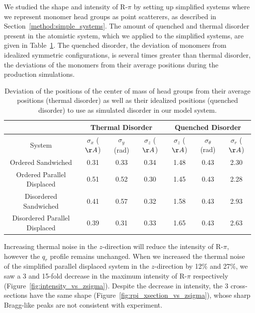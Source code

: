 \documentclass[journal=jpcbfk,manuscript=article]{achemso}
\begin{document}
  We studied the shape and intensity of R-$\pi$ by setting up simplified
  systems where we represent monomer head groups as point scatterers, as
  described in Section~\ref{method:simple_systems}. The amount of quenched and
  thermal disorder present in the atomistic system, which we applied to the
  simplified systems, are given in Table~\ref{table:quenched_disorder}. The
  quenched disorder, the deviation of monomers from idealized symmetric
  configurations, is several times greater than thermal disorder, the 
  deviations of the monomers from their average positions during the 
  production simulations.
  
  \begin{table}[h]
  \centering
  \begin{tabular}{c|ccc|ccc}
  \toprule
   		                        &           \multicolumn{3}{c}{Thermal Disorder}             &             \multicolumn{3}{c}{Quenched Disorder}               \\
  \midrule
  System                        & $\sigma_x$ ($\AA$) & $\sigma_y$ (rad) & $\sigma_z$ ($\AA$) & $\sigma_z$ ($\AA$) & $\sigma_\theta$ (rad) & $\sigma_r$ ($\AA$) \\
  \midrule
  Ordered Sandwiched            &         0.31       &       0.33       &        0.34        &        1.48        &     0.43              &     2.30           \\
  Ordered Parallel Displaced    &         0.51       &       0.52       &        0.30        &        1.45        &     0.43              &     2.28           \\ 
  Disordered Sandwiched         &         0.41       &       0.57       &        0.32        &        1.58        &     0.43              &     2.93           \\
  Disordered Parallel Displaced &         0.39       &       0.31       &        0.33        &        1.65        &     0.43              &     2.63           \\
  \bottomrule
  \end{tabular}
  \caption{Deviation of the positions of the center of mass of head groups from their average
  positions (thermal disorder) as well as their idealized positions (quenched disorder) to use 
  as simulated disorder in our model system.}
  \label{table:quenched_disorder} 
  \end{table}
  
  Increasing thermal noise in the $z$-direction will reduce the intensity
  of R-$\pi$, however the $q_r$ profile remains unchanged. When we increased the
  thermal noise of the simplified parallel displaced system in the $z$-direction by
  12\% and 27\%, we saw a 3 and 15-fold decrease in the maximum intensity of 
  R-$\pi$ respectively (Figure~\ref{fig:intensity_vs_zsigma}). Despite the decrease in 
  intensity, the 3 cross-sections have the same shape 
  (Figure~\ref{fig:rpi_xsection_vs_zsigma}), whose sharp Bragg-like peaks are
  not consistent with experiment. 
  
\end{document}
